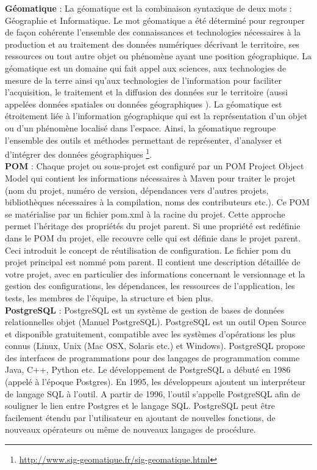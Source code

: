 \textbf{Géomatique} : La géomatique est la combinaison syntaxique de deux mots : Géographie et Informatique.
Le mot géomatique a été déterminé pour regrouper de façon cohérente l'ensemble des connaissances et technologies nécessaires à la production et au traitement des données numériques décrivant le territoire, ses ressources ou tout autre objet ou phénomène ayant une position géographique.
La géomatique est un domaine qui fait appel aux sciences, aux technologies de mesure de la terre ainsi qu'aux technologies de l'information pour faciliter l'acquisition, le traitement et la diffusion des données sur le territoire (aussi appelées \og données spatiales \fg ou \og données géographiques \fg).
La géomatique est étroitement liée à l'information géographique qui est la représentation d'un objet ou d'un phénomène localisé dans l'espace.
Ainsi, la géomatique regroupe l'ensemble des outils et méthodes permettant de représenter, d'analyser et d'intégrer des données géographiques
\footnote{\url{http://www.sig-geomatique.fr/sig-geomatique.html}}.\\

\textbf{POM} : Chaque projet ou sous-projet est configuré par un POM \og Project Object Model \fg qui contient les informations nécessaires à Maven pour traiter le projet (nom du projet, numéro de version, dépendances vers d'autres projets, bibliothèques nécessaires à la compilation, noms des contributeurs etc.). Ce POM se matérialise par un fichier pom.xml à la racine du projet. Cette approche permet l'héritage des propriétés du projet parent. Si une propriété est redéfinie dans le POM du projet, elle recouvre celle qui est définie dans le projet parent. Ceci introduit le concept de réutilisation de configuration. Le fichier pom du projet principal est nommé pom parent. Il contient une description détaillée de votre projet, avec en particulier des informations concernant le versionnage et la gestion des configurations, les dépendances, les ressources de l'application, les tests, les membres de l'équipe, la structure et bien plus.\\

\textbf{PostgreSQL} : PostgreSQL est un système de gestion de bases de données relationnelles objet (Manuel PostgreSQL). PostgreSQL est un outil Open Source et disponible gratuitement, compatible avec les systèmes d'opérations les plus connus (Linux, Unix (Mac OSX, Solaris etc.) et Windows). PostgreSQL propose des interfaces de programmations pour des langages de programmation comme Java, C++, Python etc.
Le développement de PostgreSQL a débuté en 1986 (appelé à l'époque Postgres). En 1995, les développeurs ajoutent un interpréteur de langage SQL à l'outil. A partir de 1996, l'outil s'appelle PostgreSQL afin de souligner le lien entre Postgres et le langage SQL. PostgreSQL peut être facilement étendu par l'utilisateur en ajoutant de nouvelles fonctions, de nouveaux opérateurs ou même de nouveaux langages de procédure.\\

